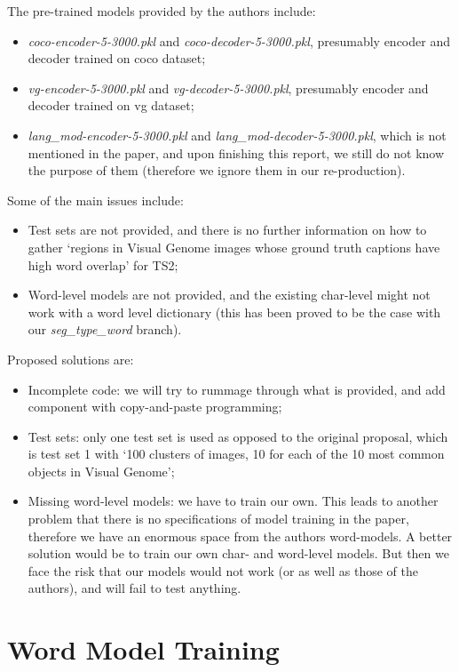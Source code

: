 \documentclass[a4paper]{scrartcl}
\begin{document}
The pre-trained models provided by the authors include: 
\begin{itemize}
  \item \emph{coco-encoder-5-3000.pkl} and \emph{coco-decoder-5-3000.pkl}, presumably encoder and decoder trained on coco dataset;
  \item \emph{vg-encoder-5-3000.pkl} and \emph{vg-decoder-5-3000.pkl}, presumably encoder and decoder trained on vg dataset;
  \item \emph{lang\_mod-encoder-5-3000.pkl} and \emph{lang\_mod-decoder-5-3000.pkl}, which is not mentioned in the paper, and upon finishing this report, we still do not know the purpose of them (therefore we ignore them in our re-production).
\end{itemize}

Some of the main issues include:
\begin{itemize}
  \item Test sets are not provided, and there is no further information on how to gather `regions in Visual Genome images whose ground truth captions have high word overlap' for TS2;
  \item Word-level models are not provided, and the existing char-level might not work with a word level dictionary (this has been proved to be the case with our \emph{seg\_type\_word} branch). 
\end{itemize}

Proposed solutions are:
\begin{itemize}
  \item Incomplete code: we will try to rummage through what is provided, and add component with copy-and-paste programming;
  \item Test sets: only one test set is used as opposed to the original proposal, which is test set 1 with `100 clusters of images, 10 for each of the 10 most common objects in Visual Genome';
  \item Missing word-level models: we have to train our own. This leads to another problem that there is no specifications of model training in the paper, therefore we have an enormous space from the authors word-models. A better solution would be to train our own char- and word-level models. But then we face the risk that our models would not work (or as well as those of the authors), and will fail to test anything. 
\end{itemize}

\section*{Word Model Training}
\end{document}
